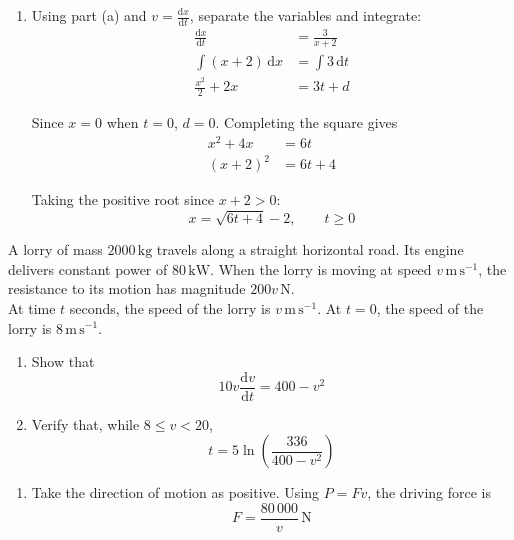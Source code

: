 \documentclass[leqno]{article}
\begin{document}
\begin{enumerate}[
  label=\textbf{\arabic*.},
  leftmargin=*,
  topsep=0pt,
  partopsep=0pt,
  parsep=0pt
]
\begin{djsSolution}
\begin{enumerate}[label=\textbf{(\alph*)}, start=1]
\item Using part (a) and \(v=\frac{\mathrm{d}x}{\mathrm{d}t}\), separate the variables and integrate:
\begin{align*}
\frac{\mathrm{d}x}{\mathrm{d}t}&=\frac{3}{x+2}\\
\int (x+2)\,\mathrm{d}x&=\int 3\,\mathrm{d}t\\
\frac{x^2}{2}+2x&=3t+d
\end{align*}

Since \(x=0\) when \(t=0\), \(d=0\). Completing the square gives
\begin{align*}
x^2+4x&=6t\\
(x+2)^2&=6t+4
\end{align*}

Taking the positive root since \(x+2>0\):
\[
x=\sqrt{6t+4}-2,\qquad t\geq 0
\]
\end{enumerate}
\end{djsSolution}

\newpage

\questionitem

A lorry of mass $2000\,\mathrm{kg}$ travels along a straight horizontal road. Its engine delivers constant power of $80\,\mathrm{kW}$. When the lorry is moving at speed $v\,\mathrm{m\,s^{-1}}$, the resistance to its motion has magnitude $200v\,\mathrm{N}$. \\

At time $t$ seconds, the speed of the lorry is $v\,\mathrm{m\,s^{-1}}$. At $t=0$, the speed of the lorry is $8\,\mathrm{m\,s^{-1}}$. \\

\begin{enumerate}[label=\textbf{(\alph*)}]
  \item Show that
  \[
  10v\dfrac{\mathrm{d}v}{\mathrm{d}t}=400-v^2
  \]
  \item Verify that, while $8\leq v<20$,
  \[
  t=5\ln\left(\dfrac{336}{400-v^2}\right)
  \]
\end{enumerate}

\vspace*{10pt}

\begin{djsSolution}
\begin{enumerate}[label=\textbf{(\alph*)}, start=1]
  \item Take the direction of motion as positive. Using \(P=Fv\), the driving force is
  \[
  F=\frac{80\,000}{v}\,\mathrm{N}
  \]


\end{enumerate}
\end{djsSolution}
\end{enumerate}
\end{document}
